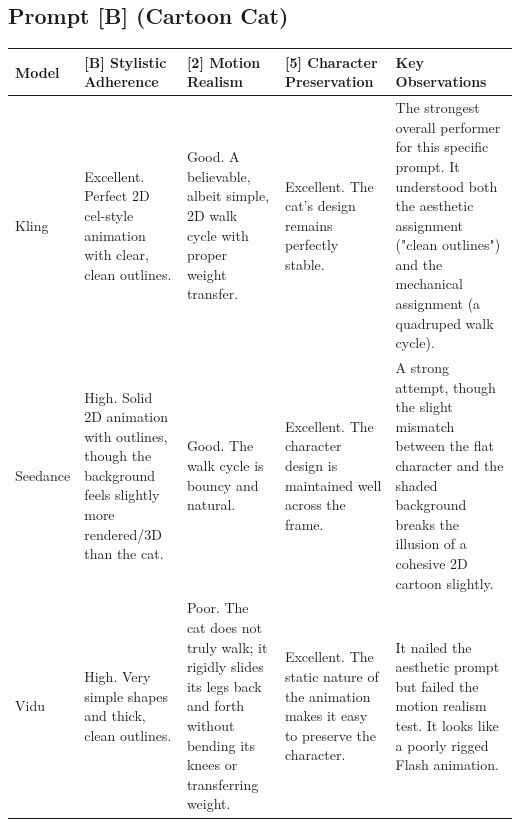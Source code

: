 \documentclass[sigconf]{acmart}
\begin{document}
\subsection*{Prompt [B] (Cartoon Cat)}
\begin{table}[t]
    \centering
    \renewcommand{\arraystretch}{1.3}
    \begin{tabularx}{\textwidth}{| l | >{\raggedright\arraybackslash}X | >{\raggedright\arraybackslash}X | >{\raggedright\arraybackslash}X | >{\raggedright\arraybackslash}X |}
        \hline
        \textbf{Model} & \textbf{[B] Stylistic Adherence}                                                                            & \textbf{[2] Motion Realism}                                                                                                    & \textbf{[5] Character Preservation}                                                                                                                 & \textbf{Key Observations}                                                                                                                                                        \\\hline
        Kling          & Excellent. Perfect 2D cel-style animation with clear, clean outlines.                                       & Good. A believable, albeit simple, 2D walk cycle with proper weight transfer.                                                  & Excellent. The cat's design remains perfectly stable.                                                                                               & The strongest overall performer for this specific prompt. It understood both the aesthetic assignment ("clean outlines") and the mechanical assignment (a quadruped walk cycle). \\\hline
        Seedance       & High. Solid 2D animation with outlines, though the background feels slightly more rendered/3D than the cat. & Good. The walk cycle is bouncy and natural.                                                                                    & Excellent. The character design is maintained well across the frame.                                                                                & A strong attempt, though the slight mismatch between the flat character and the shaded background breaks the illusion of a cohesive 2D cartoon slightly.                         \\\hline
        Vidu           & High. Very simple shapes and thick, clean outlines.                                                         & Poor. The cat does not truly walk; it rigidly slides its legs back and forth without bending its knees or transferring weight. & Excellent. The static nature of the animation makes it easy to preserve the character.                                                              & It nailed the aesthetic prompt but failed the motion realism test. It looks like a poorly rigged Flash animation.                                                                \\\hline

\end{tabularx}
\end{table}
\end{document}
